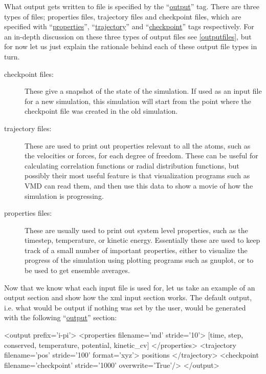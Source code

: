 \documentclass[11pt,english,fleqn]{report}
\newenvironment{code}{%
\footnotesize
\verbatim
}{
\endverbatim
\normalsize
}
\begin{document}
What output gets written to file is specified by the
{}``\hyperref[OUTPUTS]{output}'' tag.
There are three types of files; properties files,
trajectory files and checkpoint files, which are specified with
{}``\hyperref[PROPERTIES]{properties}'',
{}``\hyperref[TRAJECTORY]{trajectory}''
and {}``\hyperref[CHECKPOINT]{checkpoint}'' tags respectively.
For an in-depth discussion on these three types
of output files see \ref{outputfiles},
but for now let us just explain the rationale
behind each of these output file types in turn.

\begin{description}
\item[checkpoint files:]
These give a snapshot of the state of the simulation.
If used as an input file for a new \ipi simulation,
this simulation will start from the point where the
checkpoint file was created in the old simulation.
\item[trajectory files:]
These are used to print out properties
relevant to all the atoms, such as the velocities or forces, for each degree of freedom.
These can be useful
for calculating correlation functions or radial distribution functions,
but possibly their most useful feature is that visualization
programs such as VMD can read them, and then use this data to show
a movie of how the simulation is progressing.
\item[properties files:]
These are usually used to print out
system level properties, such as the timestep, temperature,
or kinetic energy. Essentially these are used to keep track of a small
number of important properties, either to visualize the
progress of the simulation using plotting programs such as gnuplot,
or to be used to get ensemble averages.
\end{description}

Now that we know what each input file is used for, let us take an
example of an output section and show how the xml input section works.
The default output, i.e. what would be output if nothing was set by the user,
would be generated with the following {}``\hyperref[OUTPUTS]{output}'' section:

\begin{code}
<output prefix='i-pi'>
   <properties filename='md' stride='10'>
      [time, step, conserved, temperature, potential, kinetic_cv]
   </properties>
   <trajectory filename='pos' stride='100' format='xyz'>
      positions
   </trajectory>
   <checkpoint filename='checkpoint' stride='1000' overwrite='True'/>
</output>
\end{code}
\end{document}
